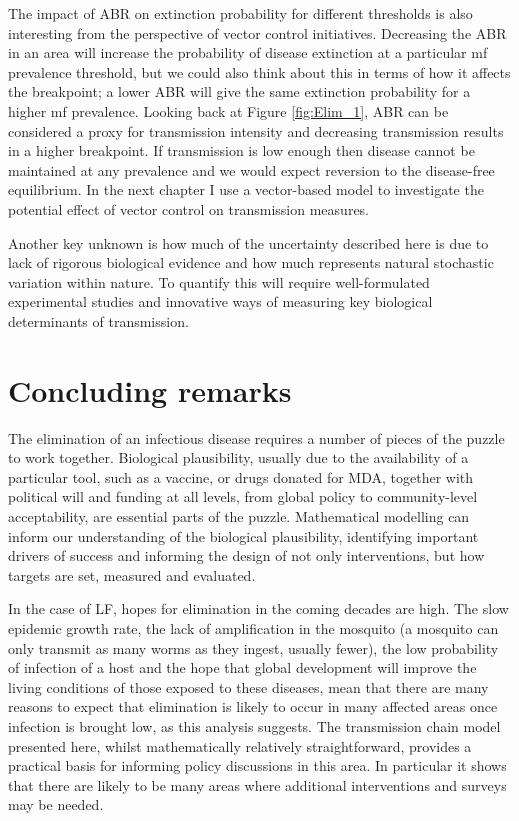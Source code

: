 The impact of ABR on extinction probability for different thresholds is also interesting from the perspective of vector control initiatives. Decreasing the ABR in an area will increase the probability of disease extinction at a particular mf prevalence threshold, but we could also think about this in terms of how it affects the breakpoint; a lower ABR will give the same extinction probability for a higher mf prevalence. Looking back at Figure \ref{fig:Elim_1}, ABR can be considered a proxy for transmission intensity and decreasing transmission results in a higher breakpoint. If transmission is low enough then disease cannot be maintained at any prevalence and we would expect reversion to the disease-free equilibrium. In the next chapter I use a vector-based model to investigate the potential effect of vector control on transmission measures.

Another key unknown is how much of the uncertainty described here is due to lack of rigorous biological evidence and how much represents natural stochastic variation within nature. To quantify this will require well-formulated experimental studies and innovative ways of measuring key biological determinants of transmission. 

\section{Concluding remarks}

The elimination of an infectious disease requires a number of pieces of the puzzle to work together. Biological plausibility, usually due to the availability of a particular tool, such as a vaccine, or drugs donated for MDA, together with political will and funding at all levels, from global policy to community-level acceptability, are essential parts of the puzzle. Mathematical modelling can inform our understanding of the biological plausibility, identifying important drivers of success and informing the design of not only interventions, but how targets are set, measured and evaluated. 

In the case of LF, hopes for elimination in the coming decades are high. The slow epidemic growth rate, the lack of amplification in the mosquito (a mosquito can only transmit as many worms as they ingest, usually fewer), the low probability of infection of a host and the hope that global development will improve the living conditions of those exposed to these diseases, mean that there are many reasons to expect that elimination is likely to occur in many affected areas once infection is brought low, as this analysis suggests. The transmission chain model presented here, whilst mathematically relatively straightforward, provides a practical basis for informing policy discussions in this area. In particular it shows that there are likely to be many areas where additional interventions and surveys may be needed.

